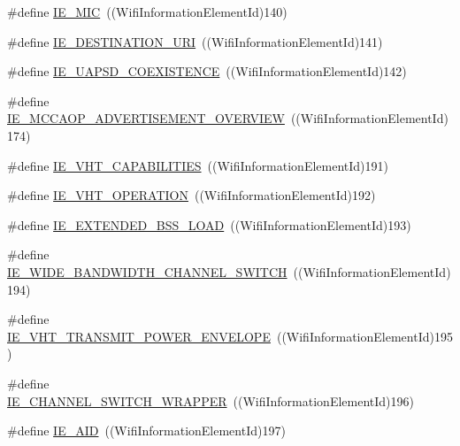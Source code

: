 \begin{DoxyCompactItemize}
\item 
\#define \hyperlink{wifi-information-element_8h_a45a22e142f426376b9c2dafcf94e41e2}{I\+E\+\_\+\+M\+IC}~((Wifi\+Information\+Element\+Id)140)
\item 
\#define \hyperlink{wifi-information-element_8h_aacee00829104996c3546112c817ff008}{I\+E\+\_\+\+D\+E\+S\+T\+I\+N\+A\+T\+I\+O\+N\+\_\+\+U\+RI}~((Wifi\+Information\+Element\+Id)141)
\item 
\#define \hyperlink{wifi-information-element_8h_a40e7b29d0d8c1adab81e449f3bf7f436}{I\+E\+\_\+\+U\+A\+P\+S\+D\+\_\+\+C\+O\+E\+X\+I\+S\+T\+E\+N\+CE}~((Wifi\+Information\+Element\+Id)142)
\item 
\#define \hyperlink{wifi-information-element_8h_ac2aafd8ad5d1189180a5f517225cab73}{I\+E\+\_\+\+M\+C\+C\+A\+O\+P\+\_\+\+A\+D\+V\+E\+R\+T\+I\+S\+E\+M\+E\+N\+T\+\_\+\+O\+V\+E\+R\+V\+I\+EW}~((Wifi\+Information\+Element\+Id)174)
\item 
\#define \hyperlink{wifi-information-element_8h_a91f00e3acca7d12d2baf731baf7bf1b0}{I\+E\+\_\+\+V\+H\+T\+\_\+\+C\+A\+P\+A\+B\+I\+L\+I\+T\+I\+ES}~((Wifi\+Information\+Element\+Id)191)
\item 
\#define \hyperlink{wifi-information-element_8h_a1ef9319f079a8c6fe67cf6d00936bc72}{I\+E\+\_\+\+V\+H\+T\+\_\+\+O\+P\+E\+R\+A\+T\+I\+ON}~((Wifi\+Information\+Element\+Id)192)
\item 
\#define \hyperlink{wifi-information-element_8h_a3ff4920872ebc3d7f433b616512a4c70}{I\+E\+\_\+\+E\+X\+T\+E\+N\+D\+E\+D\+\_\+\+B\+S\+S\+\_\+\+L\+O\+AD}~((Wifi\+Information\+Element\+Id)193)
\item 
\#define \hyperlink{wifi-information-element_8h_a607f2d219a8d786fc34ccb0ef610bc99}{I\+E\+\_\+\+W\+I\+D\+E\+\_\+\+B\+A\+N\+D\+W\+I\+D\+T\+H\+\_\+\+C\+H\+A\+N\+N\+E\+L\+\_\+\+S\+W\+I\+T\+CH}~((Wifi\+Information\+Element\+Id)194)
\item 
\#define \hyperlink{wifi-information-element_8h_af7bb5cf70e6ca771004dd97361600ec9}{I\+E\+\_\+\+V\+H\+T\+\_\+\+T\+R\+A\+N\+S\+M\+I\+T\+\_\+\+P\+O\+W\+E\+R\+\_\+\+E\+N\+V\+E\+L\+O\+PE}~((Wifi\+Information\+Element\+Id)195)
\item 
\#define \hyperlink{wifi-information-element_8h_a5a94a0c724e0e5139e749c543a9c6849}{I\+E\+\_\+\+C\+H\+A\+N\+N\+E\+L\+\_\+\+S\+W\+I\+T\+C\+H\+\_\+\+W\+R\+A\+P\+P\+ER}~((Wifi\+Information\+Element\+Id)196)
\item 
\#define \hyperlink{wifi-information-element_8h_ae1458384b8a27c2436a14b55f52f678d}{I\+E\+\_\+\+A\+ID}~((Wifi\+Information\+Element\+Id)197)
\item 

\end{DoxyCompactItemize}
